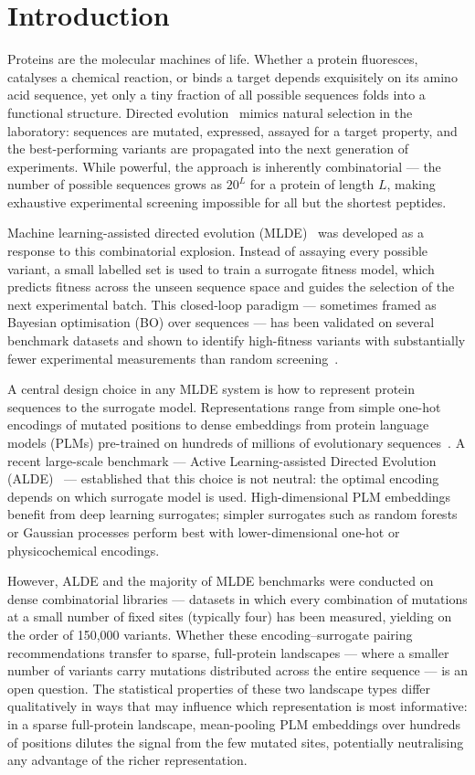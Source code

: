 \documentclass[english, 12pt, a4paper, elec, utf8, a-2b, online]{aaltothesis}
\begin{document}
\section{Introduction}
\label{sec:intro}
\thispagestyle{empty}

Proteins are the molecular machines of life.
Whether a protein fluoresces, catalyses a chemical reaction, or binds a target depends
exquisitely on its amino acid sequence, yet only a tiny fraction of all possible sequences
folds into a functional structure.
Directed evolution~\cite{Romero2009, Packer2015} mimics natural selection in the laboratory:
sequences are mutated, expressed, assayed for a target property, and the best-performing
variants are propagated into the next generation of experiments.
While powerful, the approach is inherently combinatorial --- the number of possible sequences grows
as $20^L$ for a protein of length $L$, making exhaustive experimental screening impossible
for all but the shortest peptides.

Machine learning-assisted directed evolution (MLDE)~\cite{Wu2019} was developed as a response
to this combinatorial explosion.
Instead of assaying every possible variant, a small labelled set is used to train a
surrogate fitness model, which predicts fitness across the unseen sequence space and guides
the selection of the next experimental batch.
This closed-loop paradigm --- sometimes framed as Bayesian optimisation (BO) over sequences ---
has been validated on several benchmark datasets and shown to identify high-fitness variants
with substantially fewer experimental measurements than random
screening~\cite{Wu2019, Wittmann2021, Yang2025}.

A central design choice in any MLDE system is how to represent protein sequences to the surrogate
model.
Representations range from simple one-hot encodings of mutated positions to dense embeddings
from protein language models (PLMs) pre-trained on hundreds of millions of evolutionary
sequences~\cite{Lin2023ESM2}.
A recent large-scale benchmark --- Active Learning-assisted Directed Evolution
(ALDE)~\cite{Yang2025} --- established that this choice is not neutral: the optimal encoding
depends on which surrogate model is used.
High-dimensional PLM embeddings benefit from deep learning surrogates; simpler surrogates
such as random forests or Gaussian processes perform best with lower-dimensional one-hot or
physicochemical encodings.

However, ALDE and the majority of MLDE benchmarks were conducted on dense combinatorial libraries
--- datasets in which every combination of mutations at a small number of fixed sites (typically four)
has been measured, yielding on the order of 150,000 variants.
Whether these encoding--surrogate pairing recommendations transfer to sparse, full-protein
landscapes --- where a smaller number of variants carry mutations distributed across the entire
sequence --- is an open question.
The statistical properties of these two landscape types differ qualitatively in ways that
may influence which representation is most informative: in a sparse full-protein landscape,
mean-pooling PLM embeddings over hundreds of positions dilutes the signal from the few mutated
sites, potentially neutralising any advantage of the richer representation.
\end{document}
